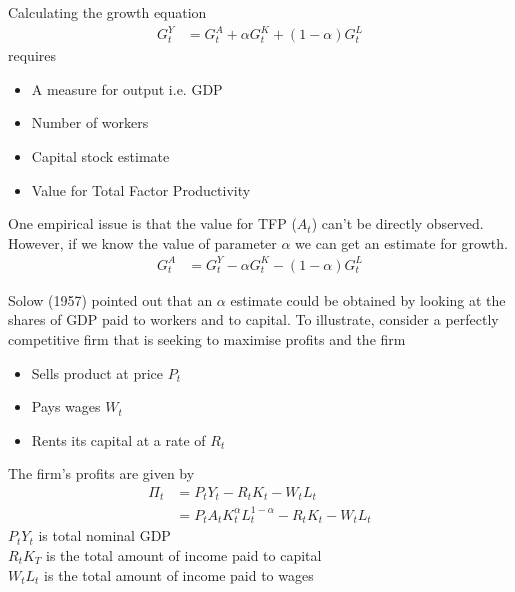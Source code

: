 \documentclass{beamer}
\begin{document}
\begin{frame}
Calculating the growth equation
\begin{align}
  G_t ^Y &=G_t^A +\alpha G_t^K + (1-\alpha)G_t^L
\end{align}
\medskip
requires
\begin{itemize}
  \item A measure for output i.e. GDP
  \item Number of workers
  \item Capital stock estimate 
  \item Value for Total Factor Productivity
\end{itemize}
\end{frame}

\begin{frame}
One empirical issue is that the value for TFP ($A_t$) can't be directly observed. 
However, if we know the value of parameter $\alpha$ we can get an estimate for growth. 
\begin{align}
  G_t ^A &=G_t^Y -\alpha G_t^K - (1-\alpha)G_t^L
\end{align}
\end{frame}

\begin{frame}
  Solow (1957) pointed out that an $\alpha$ estimate could be obtained by looking at the shares of GDP paid to workers and to capital. 
  To illustrate, consider a perfectly competitive firm that is seeking to maximise profits and the firm
  \begin{itemize}
    \item Sells product at price $P_t$
    \item Pays wages $W_t$
    \item Rents its capital at a rate of $R_t$
  \end{itemize}
\end{frame}

\begin{frame}
  The firm's profits are given by
  \begin{align}
    \Pi_t &= P_tY_t - R_tK_t -W_tL_t\\ \nonumber
    &= P_tA_tK_t^{\alpha}L_t^{1-\alpha}-R_tK_t - W_tL_t  
  \end{align}
  $P_t Y_t$ is total nominal GDP\\
  $R_t K_T$ is the total amount of income paid to capital\\
  $W_t L_t$ is the total amount of income paid to wages  
\end{frame}
\end{document}

